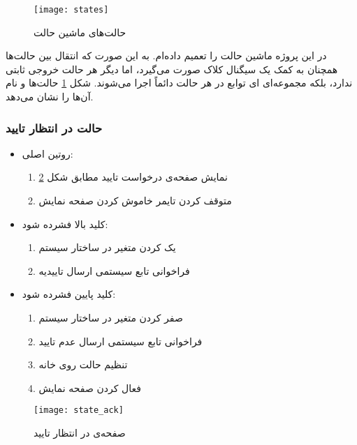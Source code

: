 	\begin{figure}[h]
		\centering
		\texttt{[image: states]}
		\caption{حالت‌های ماشین حالت}
		\label{fig:states}
	\end{figure}

در این پروژه ماشین حالت را تعمیم داده‌ام. به این صورت که انتقال بین حالت‌ها همچنان به کمک یک سیگنال کلاک صورت می‌گیرد، اما دیگر هر حالت خروجی ثابتی ندارد، بلکه مجموعه‌ای ای توابع در هر حالت دائماً اجرا می‌شوند. شکل \ref{fig:states} حالت‌ها و نام آن‌ها را نشان می‌دهد.

\subsubsection{حالت در انتظار تایید}
\begin{itemize}
	\item روتین اصلی:
		\begin{enumerate}
			\item نمایش صفحه‌ی درخواست تایید مطابق شکل \ref{fig:state-ack}
			\item متوقف کردن تایمر خاموش کردن صفحه نمایش
		\end{enumerate}
	\item کلید بالا فشرده شود:
		\begin{enumerate}
			\item یک کردن متغیر  در ساختار سیستم
			\item فراخوانی تابع سیستمی ارسال تاییدیه
		\end{enumerate}
	\item کلید پایین فشرده شود:
		\begin{enumerate}
			\item صفر کردن متغیر  در ساختار سیستم
			\item فراخوانی تابع سیستمی ارسال عدم تایید
			\item تنظیم حالت روی خانه
			\item فعال کردن صفحه نمایش
		\end{enumerate}
\end{itemize}
	\begin{figure}[h]
		\centering
		\texttt{[image: state\_ack]}
		\caption{صفحه‌ی در انتظار تایید}
		\label{fig:state-ack}
	\end{figure}

